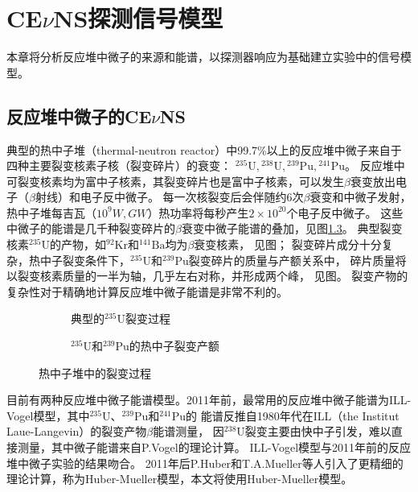 
\chapter{CE$\nu$NS探测信号模型}

本章将分析反应堆中微子的来源和能谱，以探测器响应为基础建立实验中的信号模型。

\section{反应堆中微子的CE$\nu$NS}

典型的热中子堆（thermal-neutron reactor）中99.7\%以上的反应堆中微子来自于四种主要裂变核素子核（裂变碎片）的衰变：
${}^{235}\mathrm{U},{}^{238}\mathrm{U},{}^{239}\mathrm{Pu},{}^{241}\mathrm{Pu}$\cite{juno_collaboration_tao_2020}。
反应堆中可裂变核素均为富中子核素，其裂变碎片也是富中子核素，可以发生$\beta$衰变放出电子（$\beta$射线）和电子反中微子。
每一次核裂变后会伴随约6次$\beta$衰变和中微子发射，热中子堆每吉瓦（$10^{9}\si{W},\si{GW}$）热功率将每秒产生$2\times10^{20}$个电子反中微子。
这些中微子的能谱是几千种裂变碎片的$\beta$衰变中微子能谱的叠加，见图\ref{fig:fission}。
典型裂变核素${}^{235}\mathrm{U}$的产物，如${}^{92}\mathrm{Kr}$和${}^{141}\mathrm{Ba}$均为$\beta$衰变核素，
见图；
裂变碎片成分十分复杂，热中子裂变条件下，${}^{235}\mathrm{U}$和${}^{239}\mathrm{Pu}$裂变碎片的质量与产额关系中，
碎片质量将以裂变核素质量的一半为轴，几乎左右对称，并形成两个峰\cite{crouch_fission-product_1977}，
见图。
裂变产物的复杂性对于精确地计算反应堆中微子能谱是非常不利的。

\begin{figure}
  \begin{subfigure}{.35\textwidth}
    \centering
    
    \caption{\label{fig:nuclear_fission} 典型的${}^{235}\mathrm{U}$裂变过程\cite{noauthor_nuclear_2021}}
  \end{subfigure}
  \begin{subfigure}{.65\textwidth}
    \centering
    
    \caption{\label{fig:fission_yield} ${}^{235}\mathrm{U}$和${}^{239}\mathrm{Pu}$的热中子裂变产额}
  \end{subfigure}
  \caption{\label{fig:fission} 热中子堆中的裂变过程}
\end{figure}

目前有两种反应堆中微子能谱模型。2011年前，最常用的反应堆中微子能谱为ILL-Vogel模型，其中${}^{235}\mathrm{U}$、${}^{239}\mathrm{Pu}$和${}^{241}\mathrm{Pu}$的
能谱反推自1980年代在ILL（the Institut Laue-Langevin）的裂变产物$\beta$能谱测量\cite{von_feilitzsch_experimental_1982,schreckenbach_determination_1985,hahn_antineutrino_1989}，
因${}^{238}\mathrm{U}$裂变主要由快中子引发，难以直接测量，其中微子能谱来自P.Vogel的理论计算\cite{p_vogel_neutrino_1989}。
ILL-Vogel模型与2011年前的反应堆中微子实验的结果吻合\cite{an_improved_2017}。
2011年后P.Huber和T.A.Mueller等人引入了更精细的理论计算\cite{huber_determination_2011,mueller_improved_2011}，称为Huber-Mueller模型，本文将使用Huber-Mueller模型。

